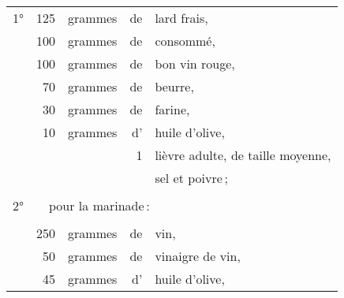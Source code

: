 \footnotesize
\begin{tabular}{@{}lrrrp{16em}}
\normalsize1°\footnotesize \hspace{2em} & 125 & grammes & de & lard frais,                                \\
\hspace{2em}  & 100 & grammes & de & consommé,                                                            \\
\hspace{2em}  & 100 & grammes & de & bon vin rouge,                                                       \\
\hspace{2em}  &  70 & grammes & de & beurre,                                                              \\
\hspace{2em}  &  30 & grammes & de & farine,                                                              \\
\hspace{2em}  &  10 & grammes & d' & huile d'olive,                                                       \\
\hspace{2em}  &     &         &  1 & lièvre adulte, de taille moyenne,                                    \\
\hspace{2em}  &     &         &    & sel et poivre ;                                                      \\
\hspace{2em}  &     &         &    &                                                                      \\
\label{pg0660} \hypertarget{p0660}{}
\normalsize 2° & \multicolumn{4}{l}{\normalsize   pour la marinade :}                                     \\
\footnotesize
\hspace{2em}  &     &         &    &                                                                      \\
\hspace{2em}  & 250 & grammes & de & vin,                                                                 \\
\hspace{2em}  &  50 & grammes & de & vinaigre de vin,                                                     \\
\hspace{2em}  &  45 & grammes & d' & huile d'olive,                                                       \\

\end{tabular}
